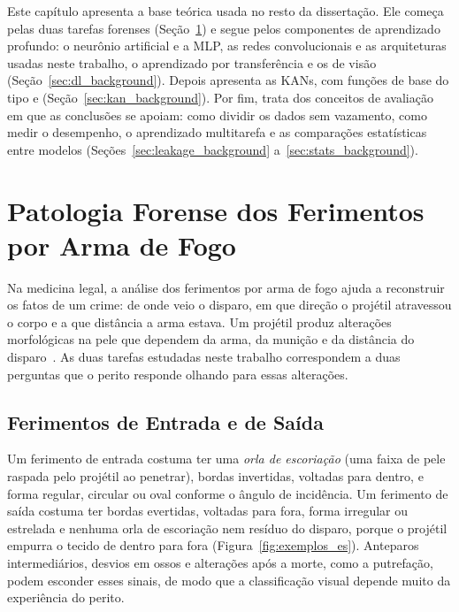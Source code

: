 \label{chap:background}

Este capítulo apresenta a base teórica usada no resto da dissertação. Ele começa pelas duas tarefas forenses (Seção~\ref{sec:forensic_background}) e segue pelos componentes de aprendizado profundo: o neurônio artificial e a \gls{MLP}, as redes convolucionais e as arquiteturas usadas neste trabalho, o aprendizado por transferência e os  de visão (Seção~\ref{sec:dl_background}). Depois apresenta as \glspl{KAN}, com funções de base do tipo  e  (Seção~\ref{sec:kan_background}). Por fim, trata dos conceitos de avaliação em que as conclusões se apoiam: como dividir os dados sem vazamento, como medir o desempenho, o aprendizado multitarefa e as comparações estatísticas entre modelos (Seções~\ref{sec:leakage_background} a~\ref{sec:stats_background}).

\section{Patologia Forense dos Ferimentos por Arma de Fogo}
\label{sec:forensic_background}

Na medicina legal, a análise dos ferimentos por arma de fogo ajuda a reconstruir os fatos de um crime: de onde veio o disparo, em que direção o projétil atravessou o corpo e a que distância a arma estava. Um projétil produz alterações morfológicas na pele que dependem da arma, da munição e da distância do disparo~\cite{dimaio2015gunshot,saukko2016knight}. As duas tarefas estudadas neste trabalho correspondem a duas perguntas que o perito responde olhando para essas alterações.

\subsection{Ferimentos de Entrada e de Saída}
\label{sec:entrada_saida}

Um ferimento de entrada costuma ter uma \textit{orla de escoriação} (uma faixa de pele raspada pelo projétil ao penetrar), bordas invertidas, voltadas para dentro, e forma regular, circular ou oval conforme o ângulo de incidência. Um ferimento de saída costuma ter bordas evertidas, voltadas para fora, forma irregular ou estrelada e nenhuma orla de escoriação nem resíduo do disparo, porque o projétil empurra o tecido de dentro para fora (Figura~\ref{fig:exemplos_es}). Anteparos intermediários, desvios em ossos e alterações após a morte, como a putrefação, podem esconder esses sinais, de modo que a classificação visual depende muito da experiência do perito.

